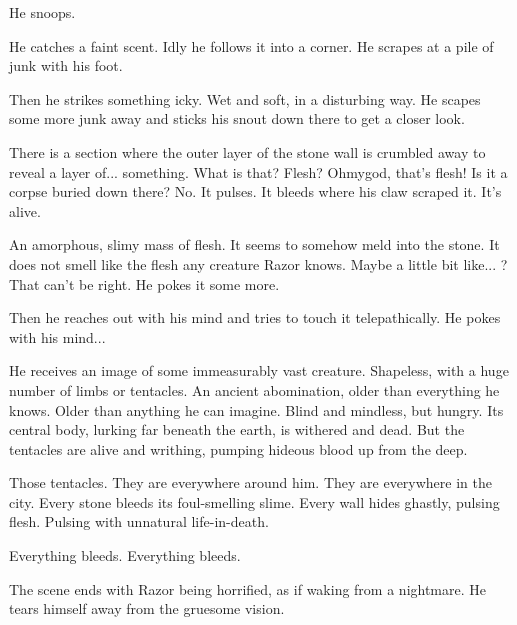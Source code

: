 He snoops.

He catches a faint scent. 
Idly he follows it into a corner. 
He scrapes at a pile of junk with his foot. 

Then he strikes something icky. 
Wet and soft, in a disturbing way. 
He scapes some more junk away and sticks his snout down there to get a closer look. 

There is a section where the outer layer of the stone wall is crumbled away to reveal a layer of... something.
What is that? 
Flesh?
Ohmygod, that's flesh!
Is it a corpse buried down there?
No. 
It pulses. 
It bleeds where his claw scraped it. 
It's alive. 

An amorphous, slimy mass of flesh. 
It seems to somehow meld into the stone. 
It does not smell like the flesh any creature Razor knows. 
Maybe a little bit like... \scatha? 
That can't be right. 
He pokes it some more. 

Then he reaches out with his mind and tries to touch it telepathically. 
He pokes with his mind... 

\begin{dream}
  He receives an image of some immeasurably vast creature. 
  Shapeless, with a huge number of limbs or tentacles. 
  An ancient abomination, older than everything he knows. 
  Older than anything he can imagine. 
  Blind and mindless, but hungry. 
  Its central body, lurking far beneath the earth, is withered and dead.
  But the tentacles are alive and writhing, pumping hideous blood up from the deep. 
  
  Those tentacles. 
  They are everywhere around him. 
  They are everywhere in the city. 
  Every stone bleeds its foul-smelling slime. 
  Every wall hides ghastly, pulsing flesh. 
  Pulsing with unnatural life-in-death. 
  
  Everything bleeds. 
  Everything bleeds. 
\end{dream}

The scene ends with Razor being horrified, as if waking from a nightmare. 
He tears himself away from the gruesome vision.







